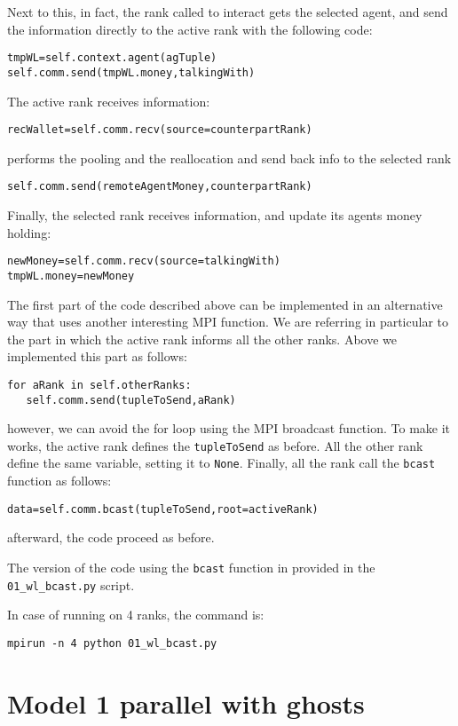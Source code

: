 \documentclass{article}
\begin{document}
Next to this, in fact, the rank called to interact gets the selected agent, and send the information directly to the active rank with the following code:
\begin{verbatim}
tmpWL=self.context.agent(agTuple)
self.comm.send(tmpWL.money,talkingWith)
\end{verbatim}             

The active rank receives information:
\begin{verbatim}
recWallet=self.comm.recv(source=counterpartRank)
\end{verbatim}
performs the pooling and the reallocation and send back info to the selected rank
\begin{verbatim}
self.comm.send(remoteAgentMoney,counterpartRank)
\end{verbatim}
Finally, the selected rank receives information, and update its agents money holding:
\begin{verbatim}
newMoney=self.comm.recv(source=talkingWith)
tmpWL.money=newMoney
\end{verbatim}

The first part of the code described above can be implemented in an alternative way that uses another interesting MPI function.
We are referring in particular to the part in which the active rank informs all the other ranks. Above we implemented this part as follows:
\begin{verbatim}
for aRank in self.otherRanks:
   self.comm.send(tupleToSend,aRank)
\end{verbatim}
however, we can avoid the for loop using the MPI broadcast function.
To make it works, the active rank defines the \verb+tupleToSend+ as before. All the other rank define the same variable, setting it to \verb+None+.
Finally, all the rank call the \verb+bcast+ function as follows:
\begin{verbatim}
data=self.comm.bcast(tupleToSend,root=activeRank)
\end{verbatim}
afterward, the code proceed as before.

The version of the code using the \verb+bcast+ function in provided in the \verb+01_wl_bcast.py+ script.

In case of running on 4 ranks, the command is:
\begin{verbatim}
mpirun -n 4 python 01_wl_bcast.py
\end{verbatim}

\section{Model 1 parallel with ghosts}
\end{document}
